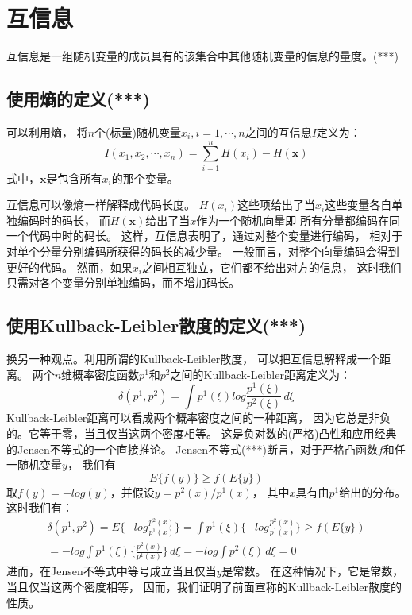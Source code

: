 \section{互信息}
互信息是一组随机变量的成员具有的该集合中其他随机变量的信息的量度。(***)

\subsection{使用熵的定义(***)}
可以利用熵，
将$n$个(标量)随机变量$x_i, i=1,\cdots,n$之间的互信息$I$定义为：
\begin{equation} \label{mutual_info_defination1}
I(x_1, x_2,\cdots ,x_n)=\sum^n_{i=1} H(x_i)-H(\bm{x})
\end{equation}
式中，$\bm{x}$是包含所有$x_i$的那个变量。

互信息可以像熵一样解释成代码长度。
$H(x_i)$这些项给出了当$x_i$这些变量各自单独编码时的码长，
而$H(\bm{x})$给出了当$x$作为一个随机向量即
所有分量都编码在同一个代码中时的码长。
这样，互信息表明了，通过对整个变量进行编码，
相对于对单个分量分别编码所获得的码长的减少量。
一般而言，对整个向量编码会得到更好的代码。
然而，如果$x_i$之间相互独立，它们都不给出对方的信息，
这时我们只需对各个变量分别单独编码，而不增加码长。

\subsection{使用Kullback-Leibler散度的定义(***)}
换另一种观点。利用所谓的Kullback-Leibler散度，
可以把互信息解释成一个距离。
两个$n$维概率密度函数$p^1$和$p^2$之间的Kullback-Leibler距离定义为：
\begin{equation}
\delta(p^1, p^2) = \int p^1(\xi) log \frac{p^1(\xi)}{p^2(\xi)}\,d\xi
\end{equation}
Kullback-Leibler距离可以看成两个概率密度之间的一种距离，
因为它总是非负的。它等于零，当且仅当这两个密度相等。
这是负对数的(严格)凸性和应用经典的Jensen不等式的一个直接推论。
Jensen不等式(***)断言，对于严格凸函数$f$和任一随机变量$y$，
我们有
\begin{equation}
E\{f(y)\} \ge f(E\{y\})
\end{equation}
取$f(y)=-log(y)$，并假设$y=p^2(x)/p^1(x)$，
其中$x$具有由$p^1$给出的分布。这时我们有：
\begin{multline}
\delta(p^1, p^2) = E\{-log \frac{p^2(x)}{p^1(x)} \} 
	= \int p^1(\xi)\{-log \frac{p^2(x)}{p^1(x)} \} 
    \ge f(E\{y\}) \\ 
    = -log \int p^1(\xi)\{ \frac{p^2(x)}{p^1(x)}\}\,d\xi
    = -log \int p^2(\xi)\,d\xi = 0
\end{multline}
进而，在Jensen不等式中等号成立当且仅当$y$是常数。
在这种情况下，它是常数，当且仅当这两个密度相等，
因而，我们证明了前面宣称的Kullback-Leibler散度的性质。

